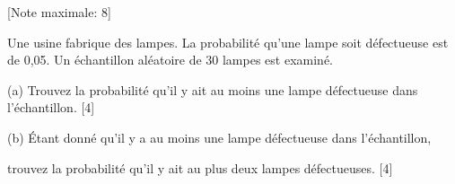 \begin{question}
  \hspace*{\fill} [Note maximale: 8]\par
  \medskip
  \noindent Une usine fabrique des lampes. La probabilité qu’une lampe soit défectueuse est de 0,05. Un échantillon aléatoire de 30 lampes est examiné.\par
  \medskip
  (a) Trouvez la probabilité qu’il y ait au moins une lampe défectueuse dans l’échantillon.\hspace*{\fill} [4]\par
  \medskip
  (b) Étant donné qu’il y a au moins une lampe défectueuse dans l’échantillon,\par
  \hspace{2em}trouvez la probabilité qu’il y ait au plus deux lampes défectueuses.\hspace*{\fill} [4]\par

\end{question}

